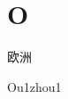 ﻿%
\section*{O}
\begin{multicols*}{2}

\begin{verbete}[Ou1zhou1]{欧洲}
\begin{pronuncia}{Ou1zhou1}
\end{pronuncia}
\end{verbete}

\end{multicols*}
